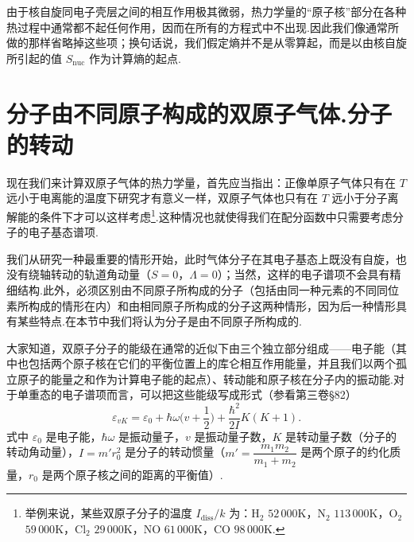 由于核自旋同电子壳层之间的相互作用极其微弱，热力学量的“原子核”部分在各种热过程中通常都不起任何作用，因而在所有的方程式中不出现.因此我们像通常所做的那样省略掉这些项；换句话说，我们假定熵并不是从零算起，而是以由核自旋所引起的值 $S_{\mathrm{nuc}}$ 作为计算熵的起点.

\section{分子由不同原子构成的双原子气体.分子的转动}

现在我们来计算双原子气体的热力学量，首先应当指出：正像单原子气体只有在 $T$ 远小于电离能的温度下研究才有意义一样，双原子气体也只有在 $T$ 远小于分子离解能的条件下才可以这样考虑\footnote{举例来说，某些双原子分子的温度 $I_{\mathrm{diss}}/k$ 为：$\mathrm{H}_2$ $52\,000$K，$\mathrm{N}_2$ $113\,000$K，$\mathrm{O}_2$ $59\,000$K，$\mathrm{Cl}_2$ $29\,000$K，NO $61\,000$K，CO $98\,000$K.}.这种情况也就使得我们在配分函数中只需要考虑分子的电子基态谱项.

我们从研究一种最重要的情形开始，此时气体分子在其电子基态上既没有自旋，也没有绕轴转动的轨道角动量（$S=0$，$\Lambda=0$）；当然，这样的电子谱项不会具有精细结构.此外，必须区别由不同原子所构成的分子（包括由同一种元素的不同同位素所构成的情形在内）和由相同原子所构成的分子这两种情形，因为后一种情形具有某些特点.在本节中我们将认为分子是由不同原子所构成的.

大家知道，双原子分子的能级在通常的近似下由三个独立部分组成——电子能（其中也包括两个原子核在它们的平衡位置上的库仑相互作用能量，并且我们以两个孤立原子的能量之和作为计算电子能的起点）、转动能和原子核在分子内的振动能.对于单重态的电子谱项而言，可以把这些能级写成形式（参看第三卷§82）
\begin{equation}
  \varepsilon_{vK}=\varepsilon_0+\hbar\omega\Big(v+\frac{1}{2}\Big)
  +\frac{\hbar^2}{2I}K(K+1).
\end{equation}
式中 $\varepsilon_0$ 是电子能，$\hbar\omega$ 是振动量子，$v$ 是振动量子数，$K$ 是转动量子数（分子的转动角动量），$I=m'r_0^2$ 是分子的转动惯量（$m'=\dfrac{m_1m_2}{m_1+m_2}$ 是两个原子的约化质量，$r_0$ 是两个原子核之间的距离的平衡值）.

